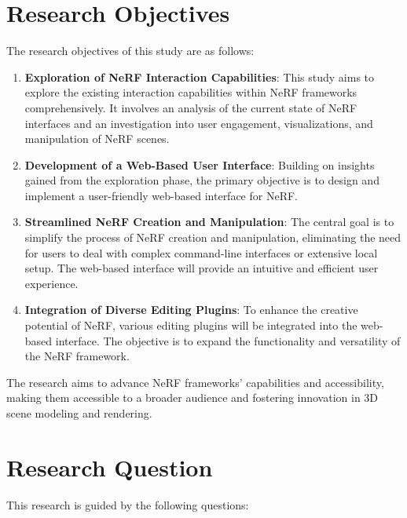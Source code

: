 \section*{Research Objectives}
\label{sec:intro:objectives}

The research objectives of this study are as follows:

\begin{enumerate}
    \item \textbf{Exploration of NeRF Interaction Capabilities}: This study aims to explore the existing interaction capabilities within NeRF frameworks comprehensively. It involves an analysis of the current state of NeRF interfaces and an investigation into user engagement, visualizations, and manipulation of NeRF scenes.

    \item \textbf{Development of a Web-Based User Interface}: Building on insights gained from the exploration phase, the primary objective is to design and implement a user-friendly web-based interface for NeRF.

    \item \textbf{Streamlined NeRF Creation and Manipulation}: The central goal is to simplify the process of NeRF creation and manipulation, eliminating the need for users to deal with complex command-line interfaces or extensive local setup. The web-based interface will provide an intuitive and efficient user experience.

    \item \textbf{Integration of Diverse Editing Plugins}: To enhance the creative potential of NeRF, various editing plugins will be integrated into the web-based interface. The objective is to expand the functionality and versatility of the NeRF framework.
\end{enumerate}

The research aims to advance NeRF frameworks' capabilities and accessibility, making them accessible to a broader audience and fostering innovation in 3D scene modeling and rendering.


\section*{Research Question}
\label{sec:intro:question}

This research is guided by the following questions:

